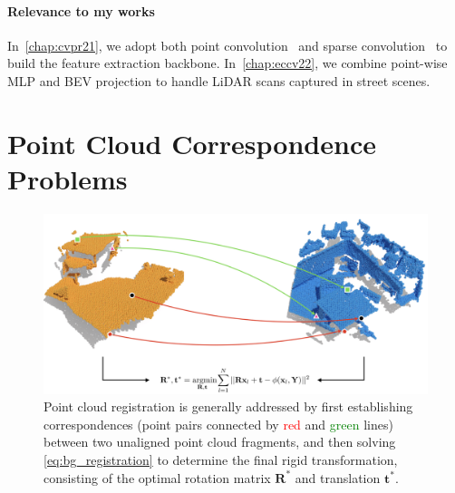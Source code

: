 \paragraph{Relevance to my works} In~\cref{chap:cvpr21}, we adopt both point convolution~\cite{thomas2019kpconv} and sparse convolution~\cite{choy2019Minkowski} to build the feature extraction backbone. In~\cref{chap:eccv22}, we combine point-wise MLP and BEV projection to handle LiDAR scans captured in street scenes. 

\section{Point Cloud Correspondence Problems}
\label{sec:bg_problems}

\begin{figure}[t]
    \centering
    \includegraphics[width=0.8\columnwidth]{imgs/registration.png}
    \caption{Point cloud registration is generally addressed by first establishing correspondences (point pairs connected by \textcolor{red}{red} and \textcolor{green}{green} lines) between two unaligned point cloud fragments, and then solving \cref{eq:bg_registration} to determine the final rigid transformation, consisting of the optimal rotation matrix $\mathbf{R}^*$ and translation $\mathbf{t}^*$.}
    \label{fig:bg_registration}
\end{figure}

